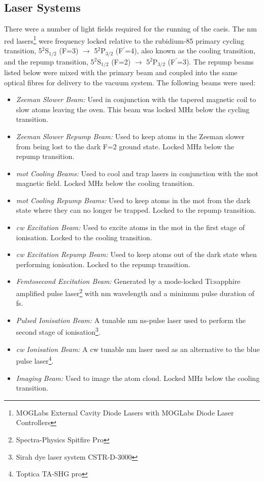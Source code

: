\subsection{Laser Systems}
There were a number of light fields required for the running of the \gls{caeis}.
The \unit[780]{nm} red lasers\footnote{MOGLabs External Cavity Diode Lasers with MOGLabs Diode Laser Controllers} were frequency locked relative to the rubidium-85 primary cycling transition, 5$^2$S$_{1/2}$ (F=3) $\rightarrow$ 5$^2$P$_{3/2}$ (F$^\prime$=4), also known as the cooling transition, and the repump transition, 5$^2$S$_{1/2}$ (F=2) $\rightarrow$ 5$^2$P$_{3/2}$ (F$^\prime$=3).
The repump beams listed below were mixed with the primary beam and coupled into the same optical fibres for delivery to the vacuum system.
The following beams were used:
\begin{itemize}
    \item{\emph{Zeeman Slower Beam:}} Used in conjunction with the tapered magnetic coil to slow atoms leaving the oven. This beam was locked \unit[250]{MHz} below the cycling transition.
    \item{\emph{Zeeman Slower Repump Beam:}} Used to keep atoms in the Zeeman slower from being lost to the dark F=2 ground state. Locked \unit[250]{MHz} below the repump transition.
    \item{\emph{\Gls{mot} Cooling Beams:}} Used to cool and trap lasers in conjunction with the \gls{mot} magnetic field. Locked \unit[10]{MHz} below the cooling transition.
    \item{\emph{\Gls{mot} Cooling Repump Beams:}} Used to keep atoms in the \gls{mot} from the dark state where they can no longer be trapped. Locked to the repump transition.
    \item{\emph{\Gls{cw} Excitation Beam:}} Used to excite atoms in the \gls{mot} in the first stage of ionisation. Locked to the cooling transition.
    \item{\emph{\Gls{cw} Excitation Repump Beam:}} Used to keep atoms out of the dark state when performing ionisation. Locked to the repump transition.
    \item{\emph{Femtosecond Excitation Beam:}} Generated by a mode-locked Ti:sapphire amplified pulse laser\footnote{Spectra-Physics Spitfire Pro} with \unit[780-830]{nm} wavelength and a minimum pulse duration of \unit[35]{fs}.
    \item{\emph{Pulsed Ionisation Beam:}} A tunable \unit[457-493]{nm} \unit[10]{ns}-pulse laser used to perform the second stage of ionisation\footnote{Sirah dye laser system CSTR-D-3000}.
    \item{\emph{\Gls{cw} Ionisation Beam:}} A \gls{cw} tunable \unit[480]{nm} laser used as an alternative to the blue pulse laser\footnote{Toptica TA-SHG pro}.
    \item{\emph{Imaging Beam:}} Used to image the atom cloud. Locked \unit[4]{MHz} below the cooling transition.
\end{itemize}


